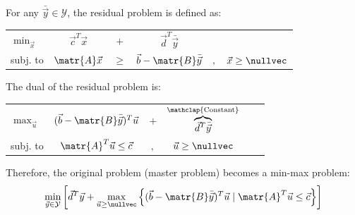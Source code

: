 \begin{descriptionlist}
\begin{description}
                For any $\bar{\vec{y}} \in \mathcal{Y}$, the residual problem is defined as:
                \begin{center}
                    \begin{tabular}{lccccc}
                        $\min_{\vec{x}}$ & $\vec{c}^T\vec{x}$ & $+$ & $\vec{d}^T\bar{\vec{y}}$ \\
                        subj. to & $\matr{A}\vec{x}$ & $\geq$ & $\vec{b} - \matr{B}\bar{\vec{y}}$ & $,$ & $\vec{x} \geq \nullvec$ \\
                    \end{tabular}
                \end{center}
                
                The dual of the residual problem is:
                \begin{center}
                    \begin{tabular}{lccccc}
                        $\max_{\vec{u}}$ & $(\vec{b} - \matr{B}\bar{\vec{y}})^T \vec{u}$ & $+$ & $\overbrace{\vec{d}^T\bar{\vec{y}}}^{\mathclap{\text{Constant}}}$ \\
                        subj. to & $\matr{A}^T\vec{u} \leq \vec{c}$ & $,$ & $\vec{u} \geq \nullvec$ \\
                    \end{tabular}
                \end{center}

                Therefore, the original problem (master problem) becomes a min-max problem:
                \[ 
                    \min_{\vec{y} \in \mathcal{Y}} \left[ 
                        \vec{d}^T\vec{y} + \max_{\vec{u} \geq \nullvec} \left\{ (\vec{b} - \matr{B}\bar{\vec{y}})^T \vec{u} \mid \matr{A}^T\vec{u} \leq \vec{c} \right\}
                    \right] 
                \]


\end{description}
\end{descriptionlist}
